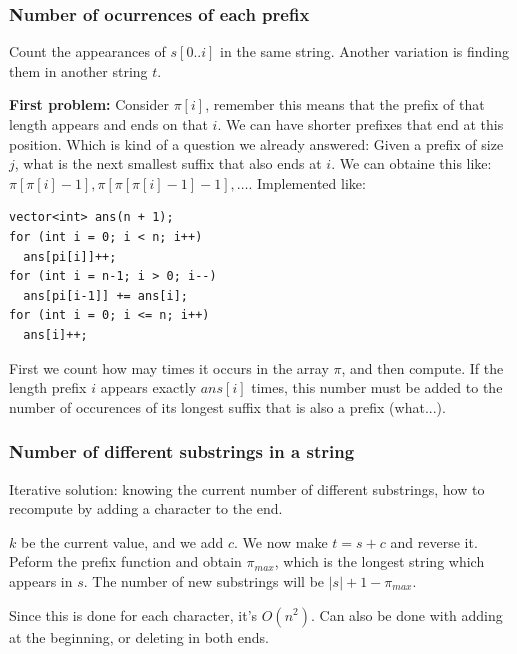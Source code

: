 \documentclass{IEEEtran}
\begin{document}
      \subsubsection{Number of ocurrences of each prefix}
        Count the appearances of $s[0..i]$ in the same string. Another variation is finding them in another string $t$.\par 
        \textbf{First problem:} Consider $\pi[i]$, remember this means that the prefix of that length appears and ends on that $i$. We can have shorter prefixes that end at this position. Which is kind of a question we already answered: Given a prefix of size $j$, what is the next smallest suffix that also ends at $i$. We can obtaine this like: $\pi[\pi[i]-1],\pi[\pi[\pi[i]-1]-1],\ldots$. Implemented like:
        \begin{lstlisting}
vector<int> ans(n + 1);
for (int i = 0; i < n; i++)
  ans[pi[i]]++;
for (int i = n-1; i > 0; i--)
  ans[pi[i-1]] += ans[i];
for (int i = 0; i <= n; i++)
  ans[i]++;
        \end{lstlisting}
        \par First we count how may times it occurs in the array $\pi$, and then compute. If the length prefix $i$ appears exactly $ans[i]$ times, this number must be added to the number of occurences of its longest suffix that is also a prefix (what...).
      \subsubsection{Number of different substrings in a string}
        Iterative solution: knowing the current number of different substrings, how to recompute by adding a character to the end.\par 
        $k$ be the current value, and we add $c$. We now make $t=s+c$ and reverse it. Peform the prefix function and obtain $\pi_{max}$, which is the longest string which appears in $s$. The number of new substrings will be $|s|+1-\pi_{max}$.\par 
        Since this is done for each character, it's $O(n^2)$. Can also be done with adding at the beginning, or deleting in both ends.
\end{document}
